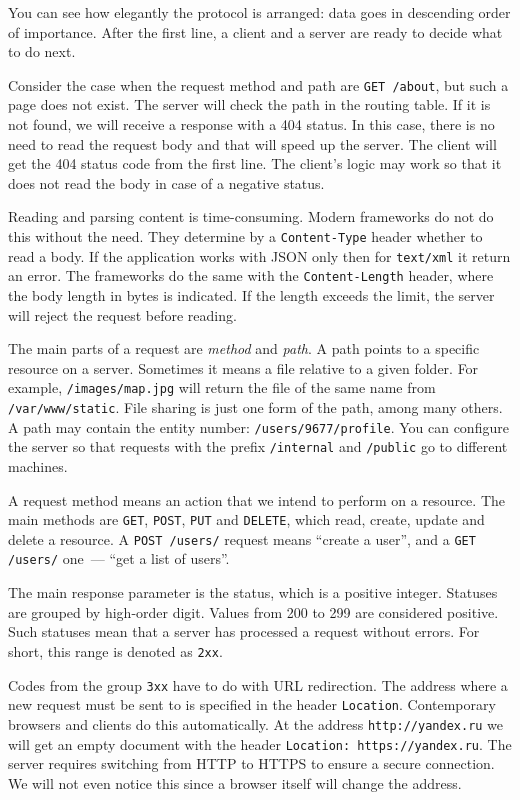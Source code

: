 You can see how elegantly the protocol is arranged: data goes in descending order of importance. After the first line, a client and a server are ready to decide what to do next.


Consider the case when the request method and path are \verb|GET /about|, but such a page does not exist. The server will check the path in the routing table. If it is not found, we will receive a response with a 404 status. In this case, there is no need to read the request body and that will speed up the server. The client will get the 404 status code from the first line. The client's logic may work so that it does not read the body in case of a negative status.

Reading and parsing content is time-consuming. Modern frameworks do not do this without the need. They determine by a \verb|Content-Type| header whether to read a body. If the application works with JSON only then for \verb|text/xml| it return an error. The frameworks do the same with the \verb|Content-Length| header, where the body length in bytes is indicated. If the length exceeds the limit, the server will reject the request before reading.

The main parts of a request are \emph{method} and \emph{path}. A path points to a specific resource on a server. Sometimes it means a file relative to a given folder. For example, \verb|/images/map.jpg| will return the file of the same name from \verb|/var/www/static|. File sharing is just one form of the path, among many others. A path may contain the entity number: \verb|/users/9677/profile|. You can configure the server so that requests with the prefix \verb|/internal| and \verb|/public| go to different machines.

A request method means an action that we intend to perform on a resource. The main methods are \verb|GET|, \verb|POST|, \verb|PUT| and \verb|DELETE|, which read, create, update and delete a resource. A \verb|POST /users/| request  means ``create a user'', and a \verb|GET /users/| one~--- ``get a list of users''.

The main response parameter is the status, which is a positive integer. Statuses are grouped by high-order digit. Values from 200 to 299 are considered positive. Such statuses mean that a server has processed a request without errors. For short, this range is denoted as \verb|2xx|.

Codes from the group \verb|3xx| have to do with URL redirection. The address where a new request must be sent to is specified in the header \verb|Location|. Contemporary browsers and clients do this automatically. At the address \verb|http://yandex.ru| we will get an empty document with the header \verb|Location: https://yandex.ru|. The server requires switching from HTTP to HTTPS to ensure a secure connection. We will not even notice this since a browser itself will change the address.

